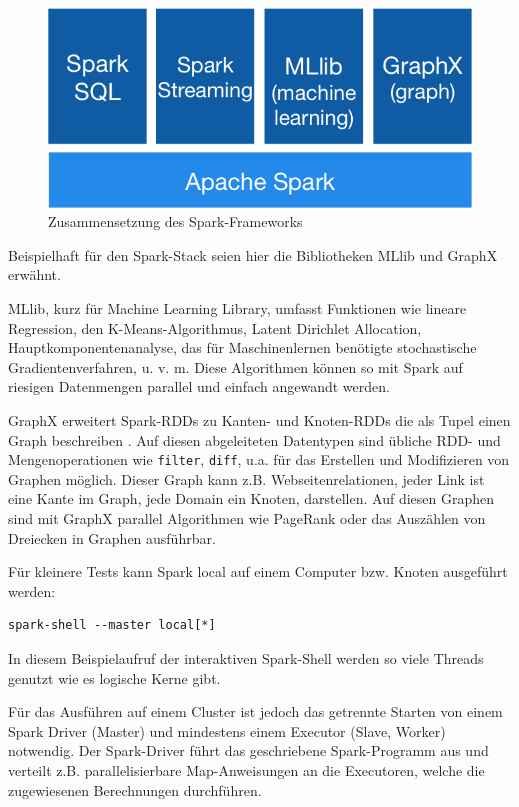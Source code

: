 \begin{figure}
    \centerline{\includegraphics[width=0.5\linewidth]{spark-stack.png}}
    \caption{Zusammensetzung des Spark-Frameworks\cite{spark}}
    \label{fig:sparkstack}
\end{figure}

Beispielhaft für den Spark-Stack seien hier die Bibliotheken MLlib\cite{mllib} und GraphX erwähnt.

MLlib, kurz für Machine Learning Library, umfasst Funktionen wie lineare Regression, den K-Means-Algorithmus, Latent Dirichlet Allocation, Hauptkomponentenanalyse, das für Maschinenlernen benötigte stochastische Gradientenverfahren, u. v. m. Diese Algorithmen können so mit Spark auf riesigen Datenmengen parallel und einfach angewandt werden.

GraphX erweitert Spark-RDDs zu Kanten- und Knoten-RDDs die als Tupel einen Graph beschreiben \cite{graphx}. Auf diesen abgeleiteten Datentypen sind übliche RDD- und Mengenoperationen wie \lstinline!filter!, \lstinline!diff!, u.a. für das Erstellen und Modifizieren von Graphen möglich. Dieser Graph kann z.B. Webseitenrelationen, jeder Link ist eine Kante im Graph, jede Domain ein Knoten, darstellen. Auf diesen Graphen sind mit GraphX parallel Algorithmen wie PageRank oder das Auszählen von Dreiecken in Graphen ausführbar.


Für kleinere Tests kann Spark local auf einem Computer bzw. Knoten ausgeführt werden:
\begin{lstlisting}
spark-shell --master local[*]
\end{lstlisting}\vspace{-1.5\baselineskip}
In diesem Beispielaufruf der interaktiven Spark-Shell werden so viele Threads genutzt wie es logische Kerne gibt.

Für das Ausführen auf einem Cluster ist jedoch das getrennte Starten von einem Spark Driver (Master) und mindestens einem Executor (Slave, Worker) notwendig. Der Spark-Driver führt das geschriebene Spark-Programm aus und verteilt z.B. parallelisierbare Map-Anweisungen an die Executoren, welche die zugewiesenen Berechnungen durchführen.

